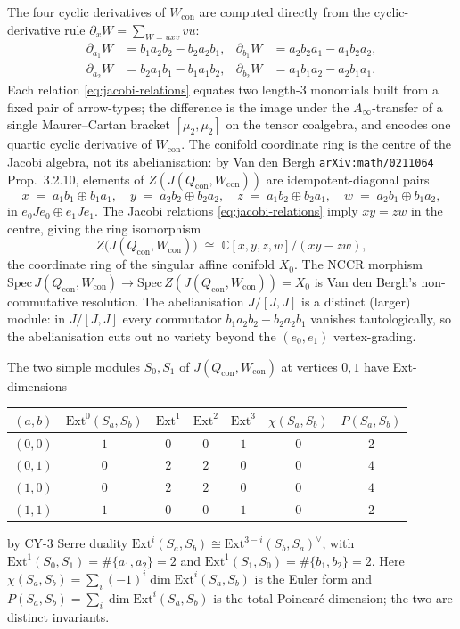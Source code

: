 \documentclass[11pt]{amsart}
\theoremstyle{definition}
\providecommand{\Ext}{\mathrm{Ext}}
\providecommand{\bC}{\mathbb{C}}
\begin{document}
The four cyclic derivatives of $W_{\mathrm{con}}$ are computed directly from
the cyclic-derivative rule $\partial_x W = \sum_{W = uxv} vu$:
\begin{equation}\label{eq:jacobi-relations}
\begin{aligned}
  \partial_{a_1} W &= b_1 a_2 b_2 - b_2 a_2 b_1, &\partial_{b_1} W &= a_2 b_2 a_1 - a_1 b_2 a_2, \\
  \partial_{a_2} W &= b_2 a_1 b_1 - b_1 a_1 b_2, &\partial_{b_2} W &= a_1 b_1 a_2 - a_2 b_1 a_1.
\end{aligned}
\end{equation}
Each relation \eqref{eq:jacobi-relations} equates two length-$3$
monomials built from a fixed pair of arrow-types; the difference is
the image under the $A_\infty$-transfer of a single Maurer--Cartan
bracket $[\mu_2, \mu_2]$ on the tensor coalgebra, and encodes one
quartic cyclic derivative of $W_{\mathrm{con}}$. The conifold
coordinate ring is the centre of the Jacobi algebra, not its
abelianisation: by Van den Bergh \texttt{arXiv:math/0211064}
Prop.~3.2.10, elements of $Z(J(Q_{\mathrm{con}}, W_{\mathrm{con}}))$
are idempotent-diagonal pairs
\[
  x \;=\; a_1 b_1 \oplus b_1 a_1,
  \quad y \;=\; a_2 b_2 \oplus b_2 a_2,
  \quad z \;=\; a_1 b_2 \oplus b_2 a_1,
  \quad w \;=\; a_2 b_1 \oplus b_1 a_2,
\]
in $e_0 J e_0 \oplus e_1 J e_1$. The Jacobi relations
\eqref{eq:jacobi-relations} imply $xy = zw$ in the centre, giving
the ring isomorphism
\[
  Z\bigl(J(Q_{\mathrm{con}}, W_{\mathrm{con}})\bigr)
  \;\cong\; \bC[x, y, z, w]/(xy - zw),
\]
the coordinate ring of the singular affine conifold $X_0$. The NCCR
morphism $\mathrm{Spec}\, J(Q_{\mathrm{con}}, W_{\mathrm{con}}) \to
\mathrm{Spec}\, Z(J(Q_{\mathrm{con}}, W_{\mathrm{con}})) = X_0$ is Van
den Bergh's non-commutative resolution. The abelianisation
$J/[J, J]$ is a distinct (larger) module: in $J/[J, J]$ every
commutator $b_1 a_2 b_2 - b_2 a_2 b_1$ vanishes tautologically, so
the abelianisation cuts out no variety beyond the $(e_0, e_1)$
vertex-grading.

The two simple modules $S_0, S_1$ of $J(Q_{\mathrm{con}}, W_{\mathrm{con}})$
at vertices $0, 1$ have Ext-dimensions
\begin{center}
\begin{tabular}{ccccc|cc}
\toprule
$(a,b)$ & $\Ext^0(S_a,S_b)$ & $\Ext^1$ & $\Ext^2$ & $\Ext^3$
  & $\chi(S_a, S_b)$ & $P(S_a, S_b)$ \\
\midrule
$(0,0)$ & $1$ & $0$ & $0$ & $1$ & $0$ & $2$ \\
$(0,1)$ & $0$ & $2$ & $2$ & $0$ & $0$ & $4$ \\
$(1,0)$ & $0$ & $2$ & $2$ & $0$ & $0$ & $4$ \\
$(1,1)$ & $1$ & $0$ & $0$ & $1$ & $0$ & $2$ \\
\bottomrule
\end{tabular}
\end{center}
by CY-$3$ Serre duality $\Ext^i(S_a, S_b) \cong \Ext^{3-i}(S_b, S_a)^\vee$,
with $\Ext^1(S_0, S_1) = \#\{a_1, a_2\} = 2$ and
$\Ext^1(S_1, S_0) = \#\{b_1, b_2\} = 2$. Here $\chi(S_a, S_b) =
\sum_i (-1)^i \dim\Ext^i(S_a, S_b)$ is the Euler form and $P(S_a, S_b)
= \sum_i \dim\Ext^i(S_a, S_b)$ is the total Poincar\'e dimension; the
two are distinct invariants.
\end{document}
